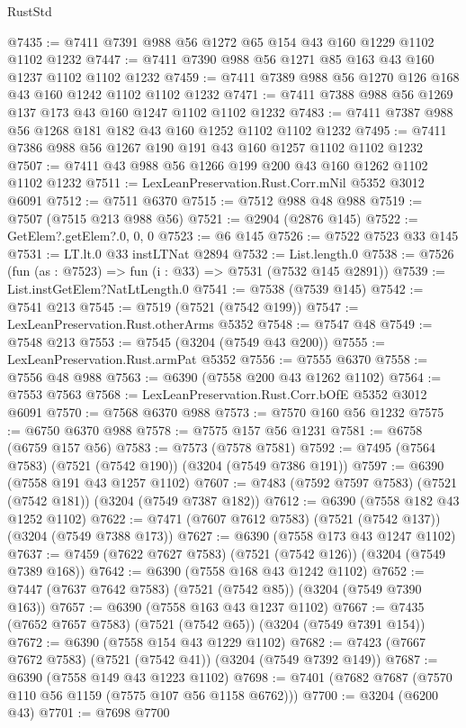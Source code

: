 \begin{lexlean}{RustStd}
\begin{coremodule}
@7435 := @7411 @7391 @988 @56 @1272 @65 @154 @43 @160 @1229 @1102 @1102 @1232
@7447 := @7411 @7390 @988 @56 @1271 @85 @163 @43 @160 @1237 @1102 @1102 @1232
@7459 := @7411 @7389 @988 @56 @1270 @126 @168 @43 @160 @1242 @1102 @1102 @1232
@7471 := @7411 @7388 @988 @56 @1269 @137 @173 @43 @160 @1247 @1102 @1102 @1232
@7483 := @7411 @7387 @988 @56 @1268 @181 @182 @43 @160 @1252 @1102 @1102 @1232
@7495 := @7411 @7386 @988 @56 @1267 @190 @191 @43 @160 @1257 @1102 @1102 @1232
@7507 := @7411 @43 @988 @56 @1266 @199 @200 @43 @160 @1262 @1102 @1102 @1232
@7511 := LexLeanPreservation.Rust.Corr.mNil @5352 @3012 @6091
@7512 := @7511 @6370
@7515 := @7512 @988 @48 @988
@7519 := @7507 (@7515 @213 @988 @56)
@7521 := @2904 (@2876 @145)
@7522 := GetElem?.getElem?.{0, 0, 0}
@7523 := @6 @145
@7526 := @7522 @7523 @33 @145
@7531 := LT.lt.{0} @33 instLTNat @2894
@7532 := List.length.{0}
@7538 := @7526 (fun (as : @7523) => fun (i : @33) => @7531 (@7532 @145 @2891))
@7539 := List.instGetElem?NatLtLength.{0}
@7541 := @7538 (@7539 @145)
@7542 := @7541 @213
@7545 := @7519 (@7521 (@7542 @199))
@7547 := LexLeanPreservation.Rust.otherArms @5352
@7548 := @7547 @48
@7549 := @7548 @213
@7553 := @7545 (@3204 (@7549 @43 @200))
@7555 := LexLeanPreservation.Rust.armPat @5352
@7556 := @7555 @6370
@7558 := @7556 @48 @988
@7563 := @6390 (@7558 @200 @43 @1262 @1102)
@7564 := @7553 @7563
@7568 := LexLeanPreservation.Rust.Corr.bOfE @5352 @3012 @6091
@7570 := @7568 @6370 @988
@7573 := @7570 @160 @56 @1232
@7575 := @6750 @6370 @988
@7578 := @7575 @157 @56 @1231
@7581 := @6758 (@6759 @157 @56)
@7583 := @7573 (@7578 @7581)
@7592 := @7495 (@7564 @7583) (@7521 (@7542 @190)) (@3204 (@7549 @7386 @191))
@7597 := @6390 (@7558 @191 @43 @1257 @1102)
@7607 := @7483 (@7592 @7597 @7583) (@7521 (@7542 @181)) (@3204 (@7549 @7387 @182))
@7612 := @6390 (@7558 @182 @43 @1252 @1102)
@7622 := @7471 (@7607 @7612 @7583) (@7521 (@7542 @137)) (@3204 (@7549 @7388 @173))
@7627 := @6390 (@7558 @173 @43 @1247 @1102)
@7637 := @7459 (@7622 @7627 @7583) (@7521 (@7542 @126)) (@3204 (@7549 @7389 @168))
@7642 := @6390 (@7558 @168 @43 @1242 @1102)
@7652 := @7447 (@7637 @7642 @7583) (@7521 (@7542 @85)) (@3204 (@7549 @7390 @163))
@7657 := @6390 (@7558 @163 @43 @1237 @1102)
@7667 := @7435 (@7652 @7657 @7583) (@7521 (@7542 @65)) (@3204 (@7549 @7391 @154))
@7672 := @6390 (@7558 @154 @43 @1229 @1102)
@7682 := @7423 (@7667 @7672 @7583) (@7521 (@7542 @41)) (@3204 (@7549 @7392 @149))
@7687 := @6390 (@7558 @149 @43 @1223 @1102)
@7698 := @7401 (@7682 @7687 (@7570 @110 @56 @1159 (@7575 @107 @56 @1158 @6762)))
@7700 := @3204 (@6200 @43)
@7701 := @7698 @7700

\end{coremodule}
\end{lexlean}
